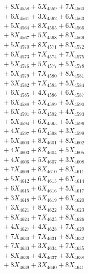 \documentclass[a4paper,10pt]{article}
\begin{document}
{\begin{align}
&\;  + 8 X_{4558} + 5 X_{4559} + 7 X_{4560} \\[0.3ex]
&\;  + 6 X_{4561} + 3 X_{4562} + 6 X_{4563} \\[0.3ex]
&\;  + 5 X_{4564} + 8 X_{4565} + 6 X_{4566} \\[0.3ex]
&\;  + 8 X_{4567} + 5 X_{4568} + 8 X_{4569} \\[0.5ex]\allowbreak
&\;  + 5 X_{4570} + 8 X_{4571} + 8 X_{4572} \\[0.3ex]
&\;  + 6 X_{4573} + 7 X_{4574} + 7 X_{4575} \\[0.3ex]
&\;  + 5 X_{4576} + 5 X_{4577} + 5 X_{4578} \\[0.3ex]
&\;  + 5 X_{4579} + 7 X_{4580} + 8 X_{4581} \\[0.3ex]
&\;  + 3 X_{4582} + 7 X_{4583} + 5 X_{4584} \\[0.3ex]
&\;  + 6 X_{4585} + 4 X_{4586} + 6 X_{4587} \\[0.3ex]
&\;  + 6 X_{4588} + 5 X_{4589} + 5 X_{4590} \\[0.3ex]
&\;  + 6 X_{4591} + 5 X_{4592} + 4 X_{4593} \\[0.3ex]
&\;  + 5 X_{4594} + 6 X_{4595} + 5 X_{4596} \\[0.3ex]
&\;  + 4 X_{4597} + 6 X_{4598} + 3 X_{4599} \\[0.5ex]\allowbreak
&\;  + 5 X_{4600} + 8 X_{4601} + 8 X_{4602} \\[0.3ex]
&\;  + 4 X_{4603} + 8 X_{4604} + 5 X_{4605} \\[0.3ex]
&\;  + 4 X_{4606} + 5 X_{4607} + 3 X_{4608} \\[0.3ex]
&\;  + 7 X_{4609} + 8 X_{4610} + 8 X_{4611} \\[0.3ex]
&\;  + 5 X_{4612} + 6 X_{4613} + 6 X_{4614} \\[0.3ex]
&\;  + 6 X_{4615} + 6 X_{4616} + 5 X_{4617} \\[0.3ex]
&\;  + 3 X_{4618} + 5 X_{4619} + 6 X_{4620} \\[0.3ex]
&\;  + 3 X_{4621} + 8 X_{4622} + 3 X_{4623} \\[0.3ex]
&\;  + 8 X_{4624} + 7 X_{4625} + 8 X_{4626} \\[0.3ex]
&\;  + 4 X_{4627} + 4 X_{4628} + 7 X_{4629} \\[0.5ex]\allowbreak
&\;  + 7 X_{4630} + 7 X_{4631} + 8 X_{4632} \\[0.3ex]
&\;  + 7 X_{4633} + 3 X_{4634} + 7 X_{4635} \\[0.3ex]
&\;  + 8 X_{4636} + 4 X_{4637} + 3 X_{4638} \\[0.3ex]
&\;  + 8 X_{4639} + 3 X_{4640} + 8 X_{4641} \\[0.3ex]

\end{align}}
\end{document}
